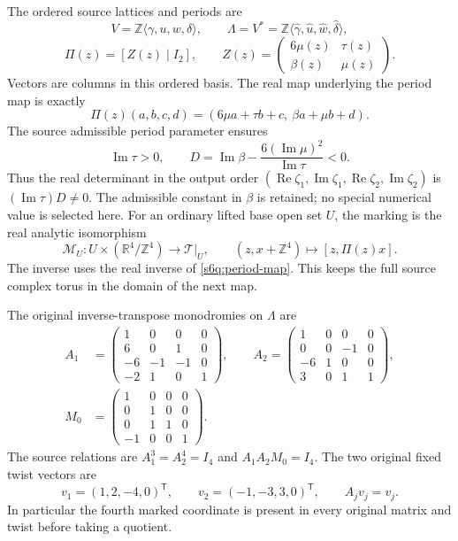 The ordered source lattices and periods are
\[
 V=\mathbb Z\langle\gamma,u,w,\delta\rangle,\qquad
 \Lambda=V^*=
 \mathbb Z\langle\widehat\gamma,\widehat u,\widehat w,\widehat\delta\rangle,
\]
\[
 \Pi(z)=[Z(z)\mid I_2],\qquad
 Z(z)=\begin{pmatrix}6\mu(z)&\tau(z)\\\beta(z)&\mu(z)\end{pmatrix}.
\]
Vectors are columns in this ordered basis. The real map underlying the
period map is exactly
\begin{equation}
 \Pi(z)(a,b,c,d)
   =(6\mu a+\tau b+c,\ \beta a+\mu b+d).
 \label{s6q:period-map}
\end{equation}
The source admissible period parameter ensures
\[
 \operatorname{Im}\tau>0,\qquad
 D=\operatorname{Im}\beta-
       \frac{6(\operatorname{Im}\mu)^2}{\operatorname{Im}\tau}<0.
\]
Thus the real determinant in the output order
$(\operatorname{Re}\zeta_1,\operatorname{Im}\zeta_1,
  \operatorname{Re}\zeta_2,\operatorname{Im}\zeta_2)$ is
$(\operatorname{Im}\tau)D\ne0$. The admissible constant in $\beta$ is
retained; no special numerical value is selected here. For an ordinary
lifted base open set $U$, the marking is the real analytic isomorphism
\begin{equation}
 \mathcal M_U:U\times(\mathbb R^4/\mathbb Z^4)
       \longrightarrow \mathcal T|_U,
 \qquad (z,x+\mathbb Z^4)\longmapsto[z,\Pi(z)x].
 \label{s6q:marking}
\end{equation}
The inverse uses the real inverse of \eqref{s6q:period-map}. This keeps
the full source complex torus in the domain of the next map.

The original inverse-transpose monodromies on $\Lambda$ are
\begin{equation}
 \begin{split}
 A_1&=\begin{pmatrix}
 1&0&0&0\\6&0&1&0\\-6&-1&-1&0\\-2&1&0&1
 \end{pmatrix},\qquad
 A_2=\begin{pmatrix}
 1&0&0&0\\0&0&-1&0\\-6&1&0&0\\3&0&1&1
 \end{pmatrix},\\
 M_0&=\begin{pmatrix}
 1&0&0&0\\0&1&0&0\\0&1&1&0\\-1&0&0&1
 \end{pmatrix}.
 \end{split}
 \label{s6q:full-matrices}
\end{equation}
The source relations are $A_1^3=A_2^4=I_4$ and $A_1A_2M_0=I_4$.
The two original fixed twist vectors are
\begin{equation}
 v_1=(1,2,-4,0)^{\mathsf T},\qquad
 v_2=(-1,-3,3,0)^{\mathsf T},\qquad A_jv_j=v_j.
 \label{s6q:full-twists}
\end{equation}
In particular the fourth marked coordinate is present in every original
matrix and twist before taking a quotient.

